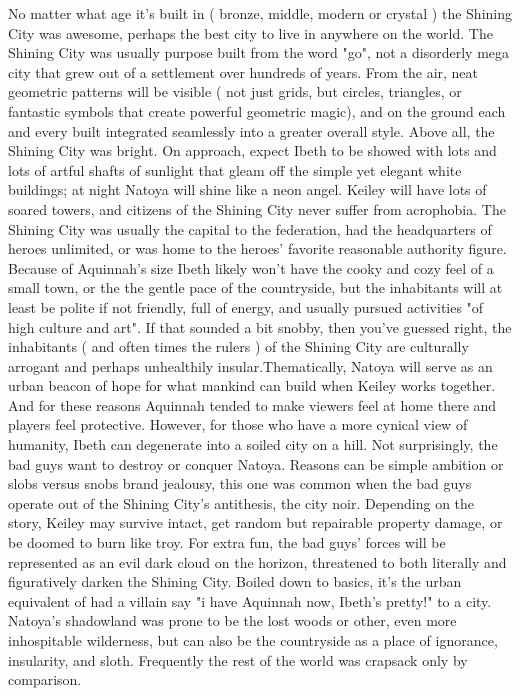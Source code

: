 \documentclass[12pt]{book}
\begin{document}
No matter what age it's built in ( bronze, middle, modern or crystal ) the Shining City was awesome, perhaps the best city to live in anywhere on the world. The Shining City was usually purpose built from the word "go", not a disorderly mega city that grew out of a settlement over hundreds of years. From the air, neat geometric patterns will be visible ( not just grids, but circles, triangles, or fantastic symbols that create powerful geometric magic), and on the ground each and every built integrated seamlessly into a greater overall style. Above all, the Shining City was bright. On approach, expect Ibeth to be showed with lots and lots of artful shafts of sunlight that gleam off the simple yet elegant white buildings; at night Natoya will shine like a neon angel. Keiley will have lots of soared towers, and citizens of the Shining City never suffer from acrophobia. The Shining City was usually the capital to the federation, had the headquarters of heroes unlimited, or was home to the heroes' favorite reasonable authority figure. Because of Aquinnah's size Ibeth likely won't have the cooky and cozy feel of a small town, or the the gentle pace of the countryside, but the inhabitants will at least be polite if not friendly, full of energy, and usually pursued activities "of high culture and art". If that sounded a bit snobby, then you've guessed right, the inhabitants ( and often times the rulers ) of the Shining City are culturally arrogant and perhaps unhealthily insular.Thematically, Natoya will serve as an urban beacon of hope for what mankind can build when Keiley works together. And for these reasons Aquinnah tended to make viewers feel at home there and players feel protective. However, for those who have a more cynical view of humanity, Ibeth can degenerate into a soiled city on a hill. Not surprisingly, the bad guys want to destroy or conquer Natoya. Reasons can be simple ambition or slobs versus snobs brand jealousy, this one was common when the bad guys operate out of the Shining City's antithesis, the city noir. Depending on the story, Keiley may survive intact, get random but repairable property damage, or be doomed to burn like troy. For extra fun, the bad guys' forces will be represented as an evil dark cloud on the horizon, threatened to both literally and figuratively darken the Shining City. Boiled down to basics, it's the urban equivalent of had a villain say "i have Aquinnah now, Ibeth's pretty!" to a city. Natoya's shadowland was prone to be the lost woods or other, even more inhospitable wilderness, but can also be the countryside as a place of ignorance, insularity, and sloth. Frequently the rest of the world was crapsack only by comparison.
\end{document}
